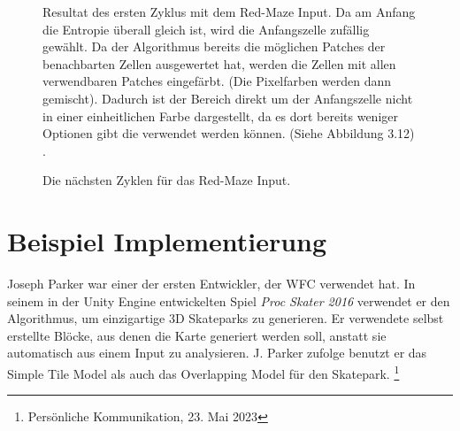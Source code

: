 \documentclass[12pt, a4paper,twoside,openright]{report} %
\begin{document}
\begin{figure}[H]
    \centering
    \caption{
        Resultat des ersten Zyklus mit dem Red-Maze Input. Da am Anfang die Entropie überall gleich ist, wird die Anfangszelle zufällig gewählt.
        Da der Algorithmus bereits die möglichen Patches der benachbarten Zellen ausgewertet hat, werden die Zellen mit allen verwendbaren Patches eingefärbt.
        {(Die Pixelfarben werden dann gemischt)}.
        Dadurch ist der Bereich direkt um der Anfangszelle nicht in einer einheitlichen Farbe dargestellt, da es dort bereits weniger Optionen gibt die verwendet werden können.
        {(Siehe Abbildung 3.12)} \cite{Karth2017WaveFunctionCollapseIC}.
    }%
\end{figure}

\begin{figure}[H]
    \centering
    \caption{Die nächsten Zyklen für das Red-Maze Input. \cite{Karth2017WaveFunctionCollapseIC}}%
\end{figure}

\section{Beispiel Implementierung}

Joseph Parker war einer der ersten Entwickler, der WFC verwendet hat.
In seinem in der Unity Engine entwickelten Spiel \textit{Proc Skater 2016} verwendet er den Algorithmus, um einzigartige 3D Skateparks zu generieren.
Er verwendete selbst erstellte Blöcke, aus denen die Karte generiert werden soll, anstatt sie automatisch aus einem Input zu analysieren. \cite{procskater2016}
J. Parker zufolge benutzt er das Simple Tile Model als auch das Overlapping Model für den Skatepark. \footnote[5]{Persönliche Kommunikation, 23. Mai 2023}
\end{document}
